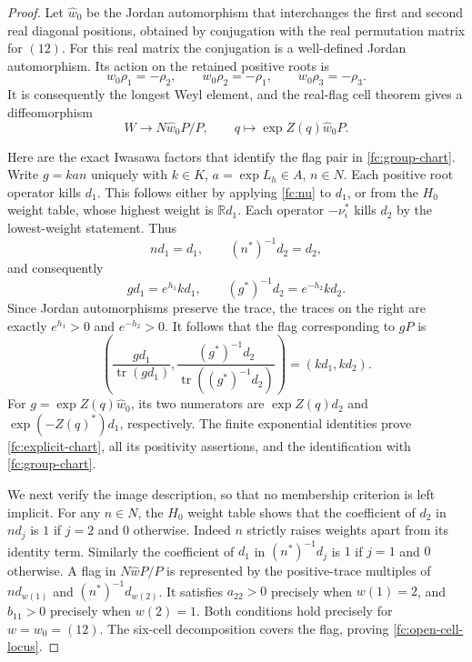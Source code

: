 \documentclass[11pt]{article}
\theoremstyle{definition}
\begin{document}
\begin{proof}
Let $\widehat w_0$ be the Jordan automorphism that interchanges
the first and second real diagonal positions, obtained by conjugation
with the real permutation matrix for $(12)$. For this real matrix
the conjugation is a well-defined Jordan automorphism. Its action on
the retained positive roots is
\[
 w_0\rho_1=-\rho_2,\qquad
 w_0\rho_2=-\rho_1,\qquad
 w_0\rho_3=-\rho_3.
\]
It is consequently the longest Weyl element, and the real-flag
cell theorem gives a diffeomorphism
\begin{equation}
 W\longrightarrow N\widehat w_0P/P,\qquad
 q\longmapsto\exp Z(q)\widehat w_0P.
 \label{fc:group-chart}
\end{equation}

Here are the exact Iwasawa factors that identify the flag pair in
\eqref{fc:group-chart}. Write $g=kan$ uniquely with
$k\in K$, $a=\exp L_h\in A$, $n\in N$. Each positive root
operator kills $d_1$. This follows either by applying
\eqref{fc:nu} to $d_1$, or from the $H_0$ weight table,
whose highest weight is $\mathbb R d_1$. Each operator
$-\nu_i^*$ kills $d_2$ by the lowest-weight statement. Thus
\[
 nd_1=d_1,\qquad (n^*)^{-1}d_2=d_2,
\]
and consequently
\begin{equation}
 gd_1=e^{h_1}kd_1,\qquad
 (g^*)^{-1}d_2=e^{-h_2}kd_2.
 \label{fc:iwasawa-flag-factors}
\end{equation}
Since Jordan automorphisms preserve the trace,
the traces on the right are exactly $e^{h_1}>0$ and $e^{-h_2}>0$.
It follows that the flag corresponding to $gP$ is
\[
 \left(\frac{gd_1}{\operatorname{tr}(gd_1)},
       \frac{(g^*)^{-1}d_2}{\operatorname{tr}((g^*)^{-1}d_2)}\right)
       =(kd_1,kd_2).
\]
For $g=\exp Z(q)\widehat w_0$, its two numerators are
$\exp Z(q)d_2$ and $\exp(-Z(q)^*)d_1$, respectively.
The finite exponential identities prove
\eqref{fc:explicit-chart}, all its positivity assertions,
and the identification with \eqref{fc:group-chart}.

We next verify the image description, so that no membership criterion
is left implicit. For any $n\in N$, the $H_0$ weight table shows
that the coefficient of $d_2$ in $nd_j$ is $1$ if $j=2$ and $0$
otherwise. Indeed $n$ strictly raises weights apart from its identity
term. Similarly the coefficient of $d_1$ in $(n^*)^{-1}d_j$ is
$1$ if $j=1$ and $0$ otherwise. A flag in $N\widehat wP/P$ is
represented by the positive-trace multiples of
$nd_{w(1)}$ and $(n^*)^{-1}d_{w(2)}$. It satisfies
$a_{22}>0$ precisely when $w(1)=2$, and $b_{11}>0$ precisely
when $w(2)=1$. Both conditions hold precisely for $w=w_0=(12)$.
The six-cell decomposition covers the flag, proving
\eqref{fc:open-cell-locus}.


\end{proof}
\end{document}
